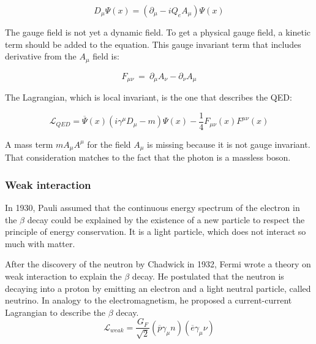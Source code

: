       \begin{equation}
        D_{\mu} \Psi\left(x\right) =  \left(\partial_{\mu} - i Q_e A_{\mu}\right) \Psi\left(x\right)
      \end{equation}

     The gauge field is not yet a dynamic field. To get a physical gauge field, a kinetic term should be added to the equation.
     This gauge invariant term that includes derivative from the $A_{\mu}$ field is:
    
     \begin{equation}
       F_{\mu \nu} \ = \ \partial_\mu A_\nu - \partial_\nu A_\mu
     \end{equation}

     The Lagrangian, which is local invariant, is the one that describes the QED:

    \begin{equation}
        \mathcal{L}_{QED} =  \overline{\Psi}\left(x\right)\left( i \gamma^\mu D_\mu - m \right) \Psi\left(x\right) - \frac{1}{4}F_{\mu \nu}\left(x\right) F^{\mu \nu}\left(x\right)
    \end{equation}

    A mass term $m A_{\mu} A^{\mu}$ for the field $A_{\mu}$ is missing because it is not gauge invariant. 
    That consideration matches to the fact that the photon is a massless boson.


    \subsubsection{Weak interaction}

    In 1930, Pauli assumed that the continuous energy spectrum of the electron in the $\beta$ decay could be explained by the existence of a new particle to respect the principle of energy conservation. 
    It is a light particle, which does not interact so much with matter.

    After the discovery of the neutron by Chadwick in 1932, Fermi wrote a theory on weak interaction to explain the $\beta$ decay. \cite{Fermi:1934hr} 
    He postulated that the neutron is decaying into a proton by emitting an electron and a light neutral particle, called neutrino.
    In analogy to the electromagnetism, he proposed a current-current Lagrangian to describe the $\beta$ decay.
    \begin{equation}
\mathcal{L}_{weak} = \frac{G_F}{\sqrt{2}}\left(\overline{p} \gamma_{\mu} n \right) \left(\overline{e} \gamma_{\mu} \nu \right)
    \end{equation}

